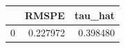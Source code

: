 \begin{tabular}{lrr}
\toprule
 & RMSPE & tau_hat \\
\midrule
0 & 0.227972 & 0.398480 \\
\bottomrule
\end{tabular}
